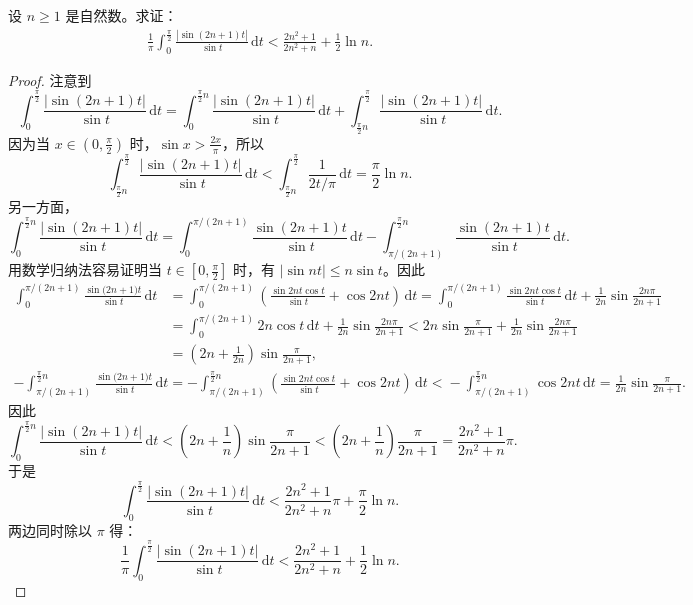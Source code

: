 \documentclass[../../main.tex]{subfiles}%
\begin{document}
\begin{example}
设 \( n \geqslant 1 \) 是自然数。求证：
\begin{align*}
\frac{1}{\pi} \int_{0}^{\frac{\pi}{2}} \frac{|\sin(2n + 1)t|}{\sin t} \, \mathrm{d}t < \frac{2n^2 + 1}{2n^2 + n} + \frac{1}{2} \ln n.
\end{align*}
\end{example}
\begin{proof}

注意到
\[
\int_{0}^{\frac{\pi}{2}} \frac{|\sin(2n + 1)t|}{\sin t} \, \mathrm{d}t = \int_{0}^{\frac{\pi}{2}n} \frac{|\sin(2n + 1)t|}{\sin t} \, \mathrm{d}t + \int_{\frac{\pi}{2}n}^{\frac{\pi}{2}} \frac{|\sin(2n + 1)t|}{\sin t} \, \mathrm{d}t.
\]
因为当 \( x \in \left( 0, \frac{\pi}{2} \right) \) 时，\( \sin x > \frac{2x}{\pi} \)，所以
\[
\int_{\frac{\pi}{2}n}^{\frac{\pi}{2}} \frac{|\sin(2n + 1)t|}{\sin t} \, \mathrm{d}t < \int_{\frac{\pi}{2}n}^{\frac{\pi}{2}} \frac{1}{2t/\pi} \, \mathrm{d}t = \frac{\pi}{2} \ln n.
\]
另一方面，
\[
\int_{0}^{\frac{\pi}{2}n} \frac{|\sin(2n + 1)t|}{\sin t} \, \mathrm{d}t = \int_{0}^{\pi/(2n + 1)} \frac{\sin(2n + 1)t}{\sin t} \, \mathrm{d}t - \int_{\pi/(2n + 1)}^{\frac{\pi}{2}n} \frac{\sin(2n + 1)t}{\sin t} \, \mathrm{d}t.
\]
用数学归纳法容易证明当 \( t \in \left[ 0, \frac{\pi}{2} \right] \) 时，有 \( |\sin nt| \leqslant n \sin t \)。因此
\begin{align*}
\int_0^{\pi/(2n+1)}{\frac{\sin\mathrm{(}2n+1)t}{\sin t}\,\mathrm{d}t}&=\int_0^{\pi/(2n+1)}{\left( \frac{\sin 2nt\cos t}{\sin t}+\cos 2nt \right) \,\mathrm{d}t=\int_0^{\pi/(2n+1)}{\frac{\sin 2nt\cos t}{\sin t}\,\mathrm{d}t}}+\frac{1}{2n}\sin \frac{2n\pi}{2n+1}
\\
&=\int_0^{\pi/(2n+1)}{2n\cos t\,\mathrm{d}t}+\frac{1}{2n}\sin \frac{2n\pi}{2n+1}<2n\sin \frac{\pi}{2n+1}+\frac{1}{2n}\sin \frac{2n\pi}{2n+1}
\\
&=\left( 2n+\frac{1}{2n} \right) \sin \frac{\pi}{2n+1},
\end{align*}
\begin{align*}
-\int_{\pi/(2n+1)}^{\frac{\pi}{2}n}{\frac{\sin\mathrm{(}2n+1)t}{\sin t}\,\mathrm{d}t}=-\int_{\pi/(2n+1)}^{\frac{\pi}{2}n}{\left( \frac{\sin 2nt\cos t}{\sin t}+\cos 2nt \right) \,\mathrm{d}t<}-\int_{\pi/(2n+1)}^{\frac{\pi}{2}n}{\cos 2nt\,\mathrm{d}t=\frac{1}{2n}\sin \frac{\pi}{2n+1}.}
\end{align*}
因此
\[
\int_{0}^{\frac{\pi}{2}n} \frac{|\sin(2n + 1)t|}{\sin t} \, \mathrm{d}t < \left( 2n + \frac{1}{n} \right) \sin \frac{\pi}{2n + 1} < \left( 2n + \frac{1}{n} \right) \frac{\pi}{2n + 1} = \frac{2n^2 + 1}{2n^2 + n} \pi.
\]
于是
\[
\int_{0}^{\frac{\pi}{2}} \frac{|\sin(2n + 1)t|}{\sin t} \, \mathrm{d}t < \frac{2n^2 + 1}{2n^2 + n} \pi + \frac{\pi}{2} \ln n.
\]
两边同时除以 \( \pi \) 得：
\[
\frac{1}{\pi} \int_{0}^{\frac{\pi}{2}} \frac{|\sin(2n + 1)t|}{\sin t} \, \mathrm{d}t < \frac{2n^2 + 1}{2n^2 + n} + \frac{1}{2} \ln n.
\]

\end{proof}
\end{document}

